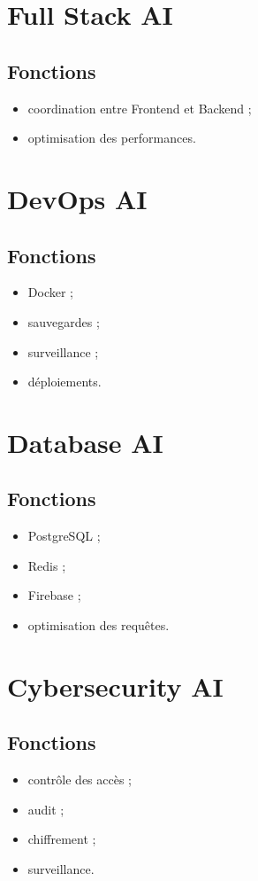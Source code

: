 \documentclass[12pt,a4paper,oneside]{book}
\begin{document}
\section{Full Stack AI}
\subsection{Fonctions}
\begin{itemize}
\item coordination entre Frontend et Backend ;
\item optimisation des performances.
\end{itemize}

\section{DevOps AI}
\subsection{Fonctions}
\begin{itemize}
\item Docker ;
\item sauvegardes ;
\item surveillance ;
\item déploiements.
\end{itemize}

\section{Database AI}
\subsection{Fonctions}
\begin{itemize}
\item PostgreSQL ;
\item Redis ;
\item Firebase ;
\item optimisation des requêtes.
\end{itemize}

\section{Cybersecurity AI}
\subsection{Fonctions}
\begin{itemize}
\item contrôle des accès ;
\item audit ;
\item chiffrement ;
\item surveillance.
\end{itemize}
\end{document}
